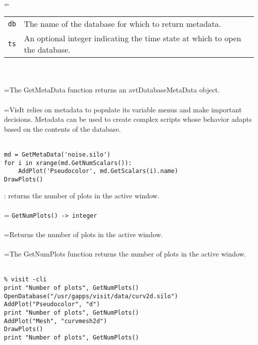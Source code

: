 \documentclass[10pt,a4paper]{report}
\begin{document}
 \\ 
\hangindent=\parindent 
\begin{tabular}{lp{9cm}}
\verb!db! & The name of the database for which to return metadata. \\
\verb!ts! & An optional integer indicating the time state at which to open the database. \\
\end{tabular} \\[-2mm]


 \\ 
\hangindent=\parindent The GetMetaData function returns an avtDatabaseMetaData object. \\[-3mm] 

 \\ 
\hangindent=\parindent VisIt relies on metadata to populate its variable menus and make important decisions. Metadata can be used to create complex scripts whose behavior adapts based on the contents of the database. \\[-3mm] 

\\[-6mm]
\begin{verbatim}md = GetMetaData('noise.silo')
for i in xrange(md.GetNumScalars()):
    AddPlot('Pseudocolor', md.GetScalars(i).name)
DrawPlots()
\end{verbatim}
\newpage


{}
: returns the number of plots in the active window.\\[-3mm]

 \\ 
\hangindent=\parindent 
\verb!GetNumPlots() -> integer!\\ [-3mm]

 \\ 
\hangindent=\parindent Returns the number of plots in the active window. \\[-3mm] 

 \\ 
\hangindent=\parindent The GetNumPlots function returns the number of plots in the active window. \\[-3mm] 

\\[-6mm]
\begin{verbatim}% visit -cli
print "Number of plots", GetNumPlots()
OpenDatabase("/usr/gapps/visit/data/curv2d.silo")
AddPlot("Pseudocolor", "d")
print "Number of plots", GetNumPlots()
AddPlot("Mesh", "curvmesh2d")
DrawPlots()
print "Number of plots", GetNumPlots()
\end{verbatim}
\newpage
\end{document}
